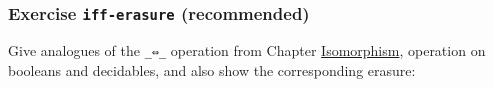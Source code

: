 \begin{fence}
\begin{code}
\AgdaSymbol{)}\AgdaSpace{}%
\AgdaSpace{}%
\AgdaSpace{}%
\AgdaSpace{}%
\AgdaSpace{}%
\AgdaSpace{}%
\AgdaSpace{}%
\AgdaSpace{}%
\AgdaSpace{}%
\AgdaSpace{}%
\AgdaSpace{}%
\AgdaSpace{}%
\AgdaSpace{}%
\AgdaSpace{}%
\<%
\\
%
\>[2]\AgdaSpace{}%
\AgdaSymbol{:}\AgdaSpace{}%
\AgdaSpace{}%
\AgdaSymbol{\{}\AgdaSpace{}%
\AgdaSymbol{:}\AgdaSpace{}%
\AgdaSymbol{\}}\AgdaSpace{}%
\AgdaSymbol{(}\AgdaSpace{}%
\AgdaSymbol{:}\AgdaSpace{}%
\AgdaSpace{}%
\AgdaSymbol{)}\AgdaSpace{}%
\AgdaSpace{}%
\AgdaSpace{}%
\AgdaSpace{}%
\AgdaSpace{}%
\AgdaSpace{}%
\AgdaSpace{}%
\AgdaSpace{}%
\AgdaSpace{}%
\AgdaSpace{}%
\<%
\end{code}
\end{fence}

\hypertarget{exercise-iff-erasure-recommended}{%
\subsubsection{\texorpdfstring{Exercise \texttt{iff-erasure}
(recommended)}{Exercise iff-erasure (recommended)}}\label{exercise-iff-erasure-recommended}}

Give analogues of the \texttt{\_⇔\_} operation from Chapter
\protect\hyperlink{Isomorphism-iff}{Isomorphism}, operation on booleans
and decidables, and also show the corresponding erasure:

